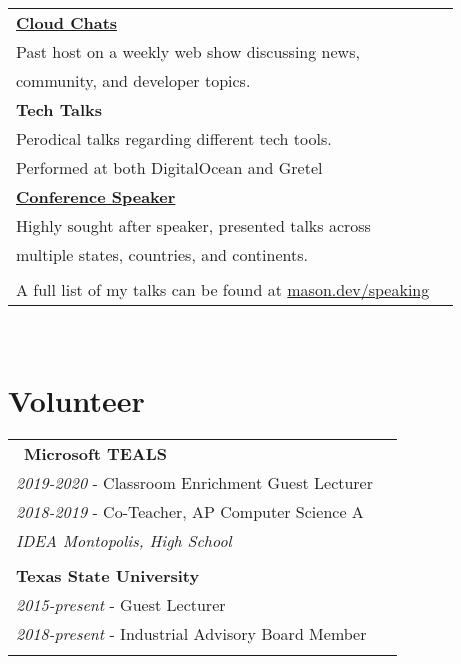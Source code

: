 \documentclass[10pt]{article} %
\newcommand\tab[1][1cm]{\hspace*{#1}}
\begin{document}
\begin{minipage}[t]{0.44\textwidth}
\begin{tabular}{ll}
\textbf{\href{https://www.digitalocean.com/community/pages/cloud-chats}{Cloud Chats}} \\
\tab Past host on a weekly web show discussing news, \\
\tab community, and developer topics.\\

\textbf{Tech Talks} \\
\tab Perodical talks regarding different tech tools. \\
\tab Performed at both DigitalOcean and Gretel\\

\textbf{\href{https://mason.dev/speaking}{Conference Speaker}} \\
\tab Highly sought after speaker, presented talks across \\ 
\tab multiple states, countries, and continents. \\
\\

A full list of my talks can be found at \href{https://mason.dev/speaking}{mason.dev/speaking}\\

\end{tabular}\\




\section{Volunteer} 

\begin{tabular}{ll}\
\textbf{Microsoft TEALS}\\
\tab\textit{2019-2020} - Classroom Enrichment Guest Lecturer\\
\tab\textit{2018-2019} - Co-Teacher, AP Computer Science A\\
\tab\tab\textit {IDEA Montopolis, High School}\\
\\

\textbf{Texas State University}\\
\tab\textit{2015-present} - Guest Lecturer\\
\tab\textit{2018-present} - Industrial Advisory Board Member\\
\\

\end{tabular}\\



    
\end{minipage} %
\end{document}

